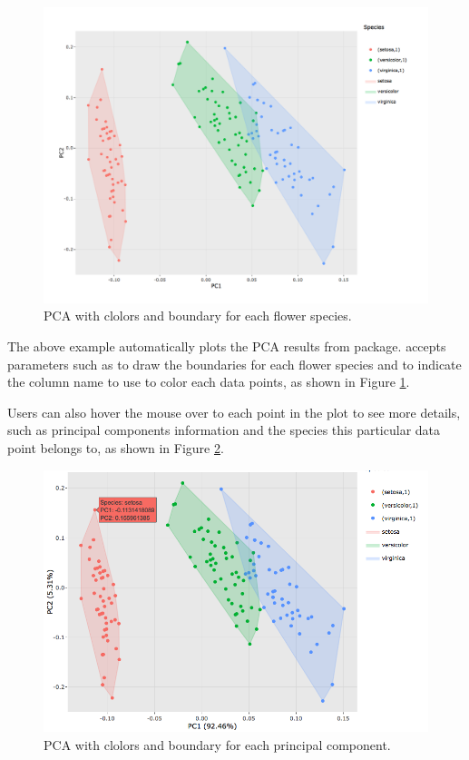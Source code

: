 \begin{figure}[htbp]
  \centering
  \includegraphics[width=145mm,scale=0.8]{images/iris_pca_full.png}
  \caption{PCA with clolors and boundary for each flower species.}
  \label{figure:iris_pca_full}
\end{figure}

The above example automatically plots the PCA results from 
package.  accepts parameters such as  to
draw the boundaries for each flower species and  to
indicate the column name to use to color each data points, as shown in
Figure \ref{figure:iris_pca_full}.

Users can also hover the mouse over to each point in the plot to see
more details, such as principal components information and the species
this particular data point belongs to, as shown in Figure
\ref{figure:iris_pca_caption}.

\begin{figure}[htbp]
  \centering
  \includegraphics[width=145mm,scale=0.8]{images/iris_pca_caption.png}
  \caption{PCA with clolors and boundary for each principal component.}
  \label{figure:iris_pca_caption}
\end{figure}

